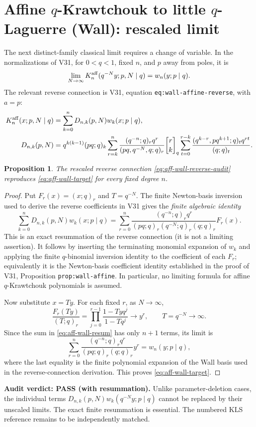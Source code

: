 \documentclass[11pt]{article}
\newtheorem{proposition}{Proposition}
\begin{document}
\section{Affine $q$-Krawtchouk to little $q$-Laguerre (Wall): rescaled limit}
The next distinct-family classical limit requires a change of variable. In the
normalizations of V31, for $0<q<1$, fixed $n$, and $p$ away from poles, it is
\begin{equation}\label{eq:aff-wall-target}
 \lim_{N\to\infty}K_n^{\rm aff}(q^{-N}y;p,N\mid q)=w_n(y;p\mid q).
\end{equation}
The relevant reverse connection is V31, equation
\texttt{eq:wall-affine-reverse}, with $a=p$:
\begin{align}\label{eq:aff-wall-reverse-audit}
 K_n^{\rm aff}(x;p,N\mid q)
 &=\sum_{k=0}^n D_{n,k}(p,N)w_k(x;p\mid q),\\
 D_{n,k}(p,N)
 &=q^{k(k-1)}(pq;q)_k
 \sum_{r=k}^n\frac{(q^{-n};q)_rq^r}{(pq,q^{-N},q;q)_r}
 {r\brack k}_q
 \sum_{t=0}^{r-k}\frac{(q^{k-r},pq^{k+1};q)_tq^{rt}}{(q;q)_t}.
 \notag
\end{align}
\begin{proposition}
The rescaled reverse connection \eqref{eq:aff-wall-reverse-audit}
reproduces \eqref{eq:aff-wall-target} for every fixed degree $n$.
\end{proposition}
\begin{proof}
Put $F_r(x)=(x;q)_r$ and $T=q^{-N}$. The finite Newton-basis
inversion used to derive the reverse coefficients in V31 gives the
\emph{finite algebraic identity}
\begin{equation}\label{eq:aff-wall-resum}
 \sum_{k=0}^n D_{n,k}(p,N)w_k(x;p\mid q)
 =\sum_{r=0}^n\frac{(q^{-n};q)_rq^r}
 {(pq;q)_r(q^{-N};q)_r(q;q)_r}F_r(x).
\end{equation}
This is an exact resummation of the reverse connection (it is not a
limiting assertion). It follows by inserting the terminating monomial
expansion of $w_k$ and applying the finite $q$-binomial inversion
identity to the coefficient of each $F_r$; equivalently it is the
Newton-basis coefficient identity established in the proof of V31,
Proposition \texttt{prop:wall-affine}. In particular, no limiting
formula for affine $q$-Krawtchouk polynomials is assumed.

Now substitute $x=Ty$. For each fixed $r$, as $N\to\infty$,
\[
 \frac{F_r(Ty)}{(T;q)_r}
 =\prod_{j=0}^{r-1}\frac{1-Tyq^j}{1-Tq^j}
 \longrightarrow y^r,
 \qquad T=q^{-N}\longrightarrow\infty.
\]
Since the sum in \eqref{eq:aff-wall-resum} has only $n+1$ terms,
its limit is
\[
 \sum_{r=0}^n\frac{(q^{-n};q)_rq^r}
 {(pq;q)_r(q;q)_r}y^r
 =w_n(y;p\mid q),
\]
where the last equality is the finite polynomial expansion of the Wall
basis used in the reverse-connection derivation. This proves
\eqref{eq:aff-wall-target}.
\end{proof}
\noindent\textbf{Audit verdict: PASS (with resummation).}
Unlike parameter-deletion cases, the individual terms
$D_{n,k}(p,N)w_k(q^{-N}y;p\mid q)$ cannot be replaced by their
unscaled limits. The exact finite resummation is essential. The
numbered KLS reference remains to be independently matched.
\end{document}
